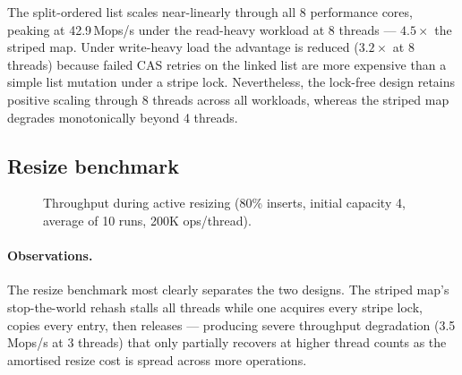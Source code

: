 \documentclass[11pt,a4paper]{article}
\begin{document}
The split-ordered list scales near-linearly through all 8 performance cores,
peaking at 42.9\,Mops/s under the read-heavy workload at 8 threads ---
$4.5\times$ the striped map. Under write-heavy load the advantage is reduced
($3.2\times$ at 8 threads) because failed CAS retries on the linked list are
more expensive than a simple list mutation under a stripe lock. Nevertheless,
the lock-free design retains positive scaling through 8 threads across all
workloads, whereas the striped map degrades monotonically beyond 4 threads.

\subsection{Resize benchmark}

\begin{figure}[ht]
\centering
{}
\caption{Throughput during active resizing (80\% inserts, initial capacity 4,
average of 10 runs, 200K ops/thread).}
\label{fig:resize}
\end{figure}

\paragraph{Observations.}
The resize benchmark most clearly separates the two designs. The striped map's
stop-the-world rehash stalls all threads while one acquires every stripe lock,
copies every entry, then releases --- producing severe throughput degradation
(3.5\,Mops/s at 3 threads) that only partially recovers at higher thread
counts as the amortised resize cost is spread across more operations.
\end{document}
